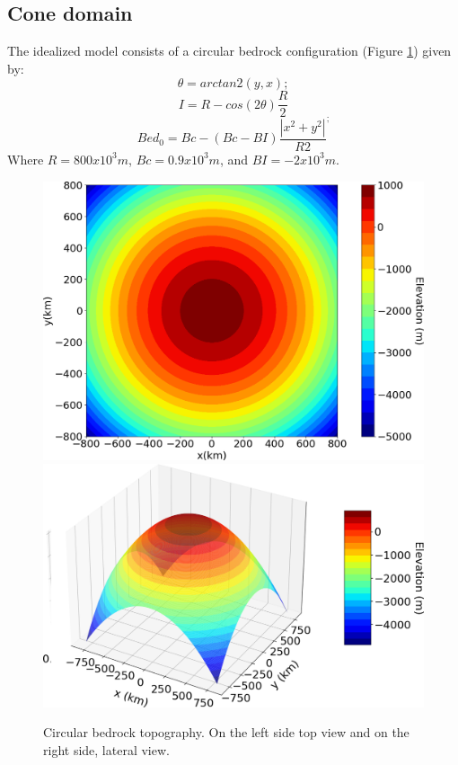 \documentclass{article}
\begin{document}
\subsection{Cone domain}
The idealized model consists of a circular bedrock configuration (Figure \ref{circular_topo_top}) given by:
\begin{equation}
	\theta=arctan2(y,x);
\end{equation}
\begin{equation}
	I=R-cos(2\theta)\frac{R}{2}
\end{equation}
\begin{equation}
	Bed_0=Bc-(Bc-BI)\frac{|x^2+y^2|}{R2}^;
\end{equation}
Where $R=800x10^3 m$, $Bc=0.9 x 10^3 m$, and $BI=-2 x 10^3 m$. 
\begin{figure}[!h]
	\centering
	\includegraphics[width=0.45\linewidth]{../fig/circular_topo_top.png}
	\includegraphics[width=0.45\linewidth]{../fig/circular_topo_jet}
	\caption{Circular bedrock topography. On the left side top view and on the right side, lateral view.}
	\label{circular_topo_top}
\end{figure}
\end{document}
